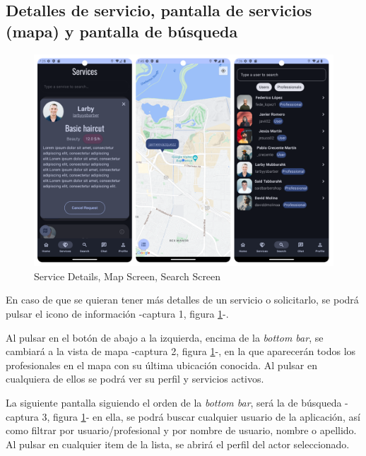 \subsection{Detalles de servicio, pantalla de servicios (mapa) y pantalla de búsqueda}
\begin{figure}[h]
	\centering
	\includegraphics[width = 1\textwidth]{Imagenes/capturasApp/detail_map_search.png}
	\caption{Service Details, Map Screen, Search Screen}
	\label{fig:capApp3}
\end{figure}

En caso de que se quieran tener más detalles de un servicio o solicitarlo, se podrá pulsar el icono de información -captura 1, figura \ref{fig:capApp3}-.

Al pulsar en el botón de abajo a la izquierda, encima de la \textit{bottom bar}, se cambiará a la vista de mapa -captura 2, figura \ref{fig:capApp3}-, en la que aparecerán todos los profesionales en el mapa con su última ubicación conocida. Al pulsar en cualquiera de ellos se podrá ver su perfil y servicios activos.

La siguiente pantalla siguiendo el orden de la \textit{bottom bar}, será la de búsqueda -captura 3, figura \ref{fig:capApp3}- en ella, se podrá buscar cualquier usuario de la aplicación, así como filtrar por usuario/profesional y por nombre de usuario, nombre o apellido. Al pulsar en cualquier item de la lista, se abrirá el perfil del actor seleccionado.
\newpage
